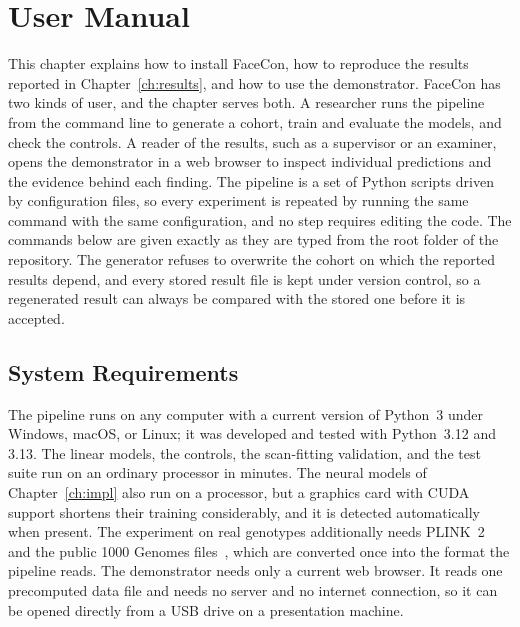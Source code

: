 \chapter{User Manual}
\label{ch:manual}
This chapter explains how to install FaceCon, how to reproduce the results reported in Chapter~\ref{ch:results}, and how to use the demonstrator. FaceCon has two kinds of user, and the chapter serves both. A researcher runs the pipeline from the command line to generate a cohort, train and evaluate the models, and check the controls. A reader of the results, such as a supervisor or an examiner, opens the demonstrator in a web browser to inspect individual predictions and the evidence behind each finding. The pipeline is a set of Python scripts driven by configuration files, so every experiment is repeated by running the same command with the same configuration, and no step requires editing the code. The commands below are given exactly as they are typed from the root folder of the repository. The generator refuses to overwrite the cohort on which the reported results depend, and every stored result file is kept under version control, so a regenerated result can always be compared with the stored one before it is accepted.

\section{System Requirements}
\label{sec:manual-req}
The pipeline runs on any computer with a current version of Python~3 under Windows, macOS, or Linux; it was developed and tested with Python~3.12 and 3.13. The linear models, the controls, the scan-fitting validation, and the test suite run on an ordinary processor in minutes. The neural models of Chapter~\ref{ch:impl} also run on a processor, but a graphics card with CUDA support shortens their training considerably, and it is detected automatically when present. The experiment on real genotypes additionally needs PLINK~2~\cite{ref:plink} and the public 1000 Genomes files~\cite{ref:kgenomes}, which are converted once into the format the pipeline reads. The demonstrator needs only a current web browser. It reads one precomputed data file and needs no server and no internet connection, so it can be opened directly from a USB drive on a presentation machine.

